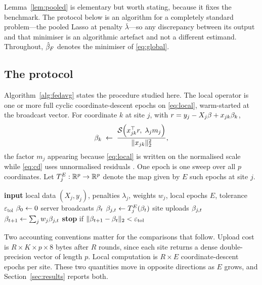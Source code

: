 Lemma~\ref{lem:pooled} is elementary but worth stating, because it fixes the
benchmark. The protocol below is an algorithm for a completely standard
problem---the pooled Lasso at penalty $\bar\lambda$---so any discrepancy
between its output and that minimiser is an algorithmic artefact and not a
different estimand. Throughout, $\hat{\beta}_F$ denotes the minimiser of
\eqref{eq:global}.

\subsection{The protocol}

Algorithm~\ref{alg:fedavg} states the procedure studied here. The local
operator is one or more full cyclic coordinate-descent epochs on
\eqref{eq:local}, warm-started at the broadcast vector. For coordinate $k$
at site $j$, with $r = y_j - X_j\beta + x_{jk}\beta_k$,
\begin{equation}
\beta_k \;\leftarrow\;
 \frac{\mathcal{S}\!\left(x_{jk}^\top r,\; \lambda_j m_j\right)}{\|x_{jk}\|_2^2},
\label{eq:cd}
\end{equation}
the factor $m_j$ appearing because \eqref{eq:local} is written on the
normalised scale while \eqref{eq:cd} uses unnormalised residuals
\citep{friedman2010}. One epoch is one sweep over all $p$ coordinates. Let
$T_j^E : \mathbb{R}^p \to \mathbb{R}^p$ denote the map given by $E$ such epochs at site $j$.

\begin{algorithm}[t]
\caption{Synchronous federated coordinate-descent Lasso (\textsc{FedAvg-CD})}
\label{alg:fedavg}
\begin{algorithmic}[1]
\State \textbf{input} local data $(X_j, y_j)$, penalties $\lambda_j$, weights
 $w_j$, local epochs $E$, tolerance $\varepsilon_{\mathrm{tol}}$
\State $\beta_0 \gets 0$
  \State server broadcasts $\beta_t$
     \State $\beta_{j,t} \gets T_j^E(\beta_t)$
     \State site uploads $\beta_{j,t}$
  \EndFor
  \State $\beta_{t+1} \gets \sum_{j} w_j \beta_{j,t}$
  \State \textbf{stop} if $\|\beta_{t+1} - \beta_t\|_2 < \varepsilon_{\mathrm{tol}}$
\EndFor
\end{algorithmic}
\end{algorithm}

Two accounting conventions matter for the comparisons that follow. Upload
cost is $R \times K \times p \times 8$ bytes after $R$ rounds, since each
site returns a dense double-precision vector of length $p$. Local
computation is $R \times E$ coordinate-descent epochs per site. These two
quantities move in opposite directions as $E$ grows, and
Section~\ref{sec:results} reports both.
